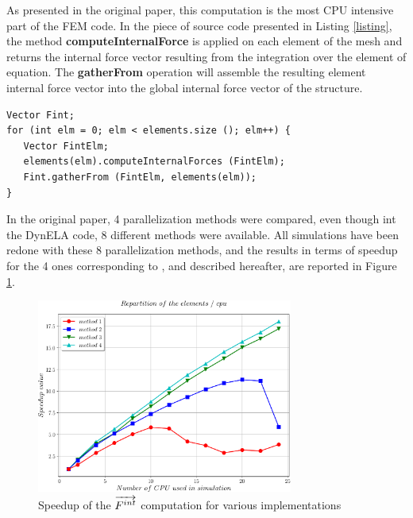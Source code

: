 As presented in the original paper, this computation is the most CPU intensive part of the FEM code. In the piece of source code presented in Listing \ref{listing}, the method \textbf{computeInternalForce} is applied on each element of the mesh and returns the internal force vector resulting from the integration over the element of equation. The \textbf{gatherFrom} operation will assemble the resulting element internal force vector into the global internal force vector of the structure.

\begin{lstlisting}[label=listing,caption={Internal forces computation (standard version)},captionpos=b]
Vector Fint;
for (int elm = 0; elm < elements.size (); elm++) {
   Vector FintElm;
   elements(elm).computeInternalForces (FintElm);
   Fint.gatherFrom (FintElm, elements(elm));
}
\end{lstlisting}

In the original paper, 4 parallelization methods were compared, even though int the DynELA code, 8 different methods were available. All simulations have been redone with these 8 parallelization methods, and the results in terms of speedup for the 4 ones corresponding to \cite{Pantale:2005}, and described hereafter, are reported in Figure \ref{speedup}.
\begin{figure}[h!] 
  \centering
  \includegraphics[width=0.75\textwidth]{./speedup.pdf}
  \caption{Speedup of the $\protect\overrightarrow{F^{int}}$ computation for various implementations}
  \label{speedup}
\end{figure}

